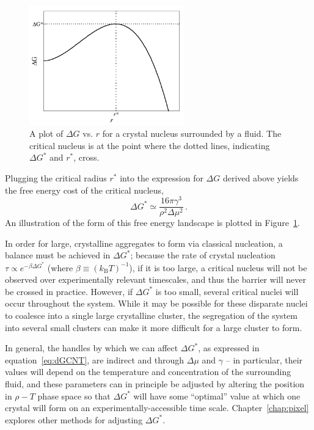 \begin{figure}
	\begin{center}
		\includegraphics[width=0.6\textwidth]{CNT.png}
	\end{center}
	\caption[$\Delta G$ vs. $r$ in classical nucleation theory]{A plot of $\Delta G$ vs. $r$ for a crystal nucleus surrounded by a fluid.  The critical nucleus is at the point where the dotted lines, indicating $\Delta G^*$ and $r^*$, cross.}\label{fig:CNT}
\end{figure}

Plugging the critical radius $r^*$ into the expression for $\Delta G$ derived above yields the free energy cost of the critical nucleus,
\begin{equation}\Delta G^* \simeq \frac{16 \pi \gamma^3}{\rho^2 \Delta \mu^2}\,.\label{eq:dGCNT}\end{equation}
An illustration of the form of this free energy landscape is plotted in Figure~\ref{fig:CNT}.

In order for large, crystalline aggregates to form via classical nucleation, a balance must be achieved in $\Delta G^*$; because the rate of crystal nucleation $\tau \propto e^{-\beta \Delta G^*}$ (where $\beta \equiv \left(k_{\textrm {B}}T\right)^{-1}$), if it is too large, a critical nucleus will not be observed over experimentally relevant timescales, and thus the barrier will never be crossed in practice.
However, if $\Delta G^*$ is too small, several critical nuclei will occur throughout the system.
While it may be possible for these disparate nuclei to coalesce into a single large crystalline cluster, the segregation of the system into several small clusters can make it more difficult for a large cluster to form.

In general, the handles by which we can affect $\Delta G^*$, as expressed in equation~\ref{eq:dGCNT}, are indirect and through $\Delta \mu$ and $\gamma$ -- in particular, their values will depend on the temperature and concentration of the surrounding fluid, and these parameters can in principle be adjusted by altering the position in $\rho-T$ phase space so that $\Delta G^*$ will have some ``optimal'' value at which one crystal will form on an experimentally-accessible time scale.
Chapter~\ref{chap:pixel} explores other methods for adjusting $\Delta G^*$.

